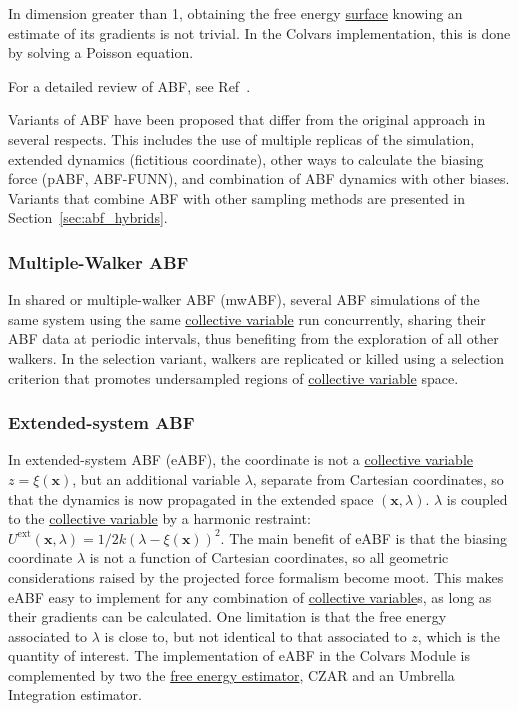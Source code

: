\documentclass[9pt,review]{livecoms}
\newcommand{\vx}{\mathbf{x}}
\begin{document}
In dimension greater than 1, obtaining the free energy \hyperlink{ref:FES} {surface} knowing an estimate of its gradients is not trivial.
In the Colvars implementation, this is done by solving a Poisson equation\cite{Lelievre2010, Alrachid2015, Henin2021integration}.

For a detailed review of ABF, see Ref~\cite{Comer2015}.

Variants of ABF have been proposed that differ from the original approach in several respects.
This includes the use of multiple replicas of the simulation, extended dynamics (fictitious coordinate), other ways to calculate the biasing force (pABF, ABF-FUNN), and combination of ABF dynamics with other biases.
Variants that combine ABF with other sampling methods are presented in Section~\ref{sec:abf_hybrids}.

\subsubsection{Multiple-Walker ABF}
\label{sec:mwABF}

In shared or multiple-walker ABF (mwABF),\cite{Lelievre2007, Minoukadeh2010, Comer2014mwABF} several ABF simulations of the same system using the same \hyperlink{ref:CV} {collective variable} run concurrently, sharing their ABF data at periodic intervals, thus benefiting from the exploration of all other walkers.
In the selection variant,\cite{Minoukadeh2010, Comer2014mwABF} walkers are replicated or killed using a selection criterion that promotes undersampled regions of \hyperlink{ref:CV} {collective variable} space.
    
\subsubsection{Extended-system ABF}
\label{sec:eABF}

In extended-system ABF (eABF),\cite{Lelievre2010eABF, Zheng2012} the coordinate is not a \hyperlink{ref:CV} {collective variable} $z = \xi(\vx)$, but an additional variable $\lambda$, separate from Cartesian coordinates, so that the dynamics is now propagated in the extended space $(\vx, \lambda)$.
$\lambda$ is coupled to the \hyperlink{ref:CV} {collective variable} by a harmonic restraint: $U^\mathrm{ext}(\vx, \lambda) = 1/2 k (\lambda - \xi(\vx))^2$.
The main benefit of eABF is that the biasing coordinate $\lambda$ is not a function of Cartesian coordinates, so all geometric considerations raised by the projected force formalism become moot. This makes eABF easy to implement for any combination of \hyperlink{ref:CV} {collective variable}s, as long as their gradients can be calculated.
One limitation is that the free energy associated to $\lambda$ is close to, but not identical to that associated to $z$, which is the quantity of interest.
The implementation of eABF in the Colvars Module\cite{Lesage2017} is complemented by two the \hyperlink{ref:FEestimator} {free energy estimator}, CZAR\cite{Lesage2017} and an Umbrella Integration estimator.\cite{Kastner2005, Zheng2012, Fu2016}
\end{document}
